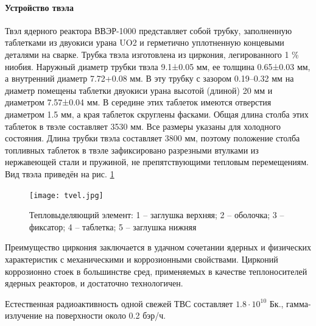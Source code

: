 \paragraph{Устройство твэла} Твэл ядерного реактора ВВЭР-1000 представляет собой трубку, заполненную таблетками из двуокиси урана UO2 и герметично уплотненную концевыми деталями на сварке. Трубка твэла изготовлена из циркония, легированного 1 \% ниобия. Наружный диаметр трубки твэла 9.1±0.05 мм, ее толщина 0.65±0.03 мм, а внутренний диаметр 7.72+0.08 мм.
В эту трубку с зазором 0.19–0.32 мм на диаметр помещены таблетки двуокиси урана высотой (длиной) 20 мм и диаметром 7.57±0.04 мм. В середине этих таблеток имеются отверстия диаметром 1.5 мм, а края таблеток скруглены фасками. Общая длина столба этих таблеток в твэле составляет 3530 мм. Все размеры указаны для холодного состояния. Длина трубки твэла составляет 3800 мм, поэтому положение столба топливных таблеток в твэле зафиксировано разрезными втулками из нержавеющей стали и пружиной, не препятствующими тепловым перемещениям. Вид твэла приведён на рис. \ref{pic:tvel} \cite{ТвэлТерновых}

\begin{figure}[H]
    \begin{center}
        \texttt{[image: tvel.jpg]}
        \caption{
                Тепловыделяющий элемент: 1 – заглушка верхняя; 2 – оболочка; 3 – фиксатор; 4 – таблетка; 5 – заглушка нижняя
        }
        \label{pic:tvel}
    \end{center}
\end{figure}

Преимущество циркония заключается в удачном сочетании ядерных и физических характеристик с механическими и коррозионными свойствами. Цирконий коррозионно стоек в большинстве сред, применяемых в качестве теплоносителей ядерных реакторов, и достаточно технологичен.

Естественная радиоактивность одной свежей ТВС составляет $1.8 \cdot 10^{10}$ Бк., гамма- излучение на поверхности около 0.2 бэр/ч.

